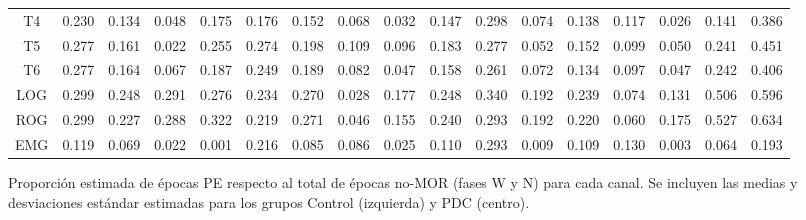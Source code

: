 \begin{SidewaysFigure}
\begin{tabular}{c||ccccc|cc||cccc|cc||ccc}
T4&0.230&0.134&0.048&0.175&0.176&0.152&0.068&0.032&0.147&0.298&0.074&0.138&0.117&0.026&0.141&0.386 \\
T5&0.277&0.161&0.022&0.255&0.274&0.198&0.109&0.096&0.183&0.277&0.052&0.152&0.099&0.050&0.241&0.451 \\
T6&0.277&0.164&0.067&0.187&0.249&0.189&0.082&0.047&0.158&0.261&0.072&0.134&0.097&0.047&0.242&0.406 \\
LOG&0.299&0.248&0.291&0.276&0.234&0.270&0.028&0.177&0.248&0.340&0.192&0.239&0.074&0.131&0.506&0.596 \\
ROG&0.299&0.227&0.288&0.322&0.219&0.271&0.046&0.155&0.240&0.293&0.192&0.220&0.060&0.175&0.527&0.634 \\
EMG&0.119&0.069&0.022&0.001&0.216&0.085&0.086&0.025&0.110&0.293&0.009&0.109&0.130&0.003&0.064&0.193
\end{tabular}
\caption{Proporci\'on estimada de \'epocas PE respecto al total de \'epocas no-MOR 
(fases W y N) para cada
canal. Se incluyen las medias y desviaciones est\'andar estimadas para los grupos 
Control (izquierda) y PDC (centro).}
\label{gpos_nmor}
\end{SidewaysFigure}

